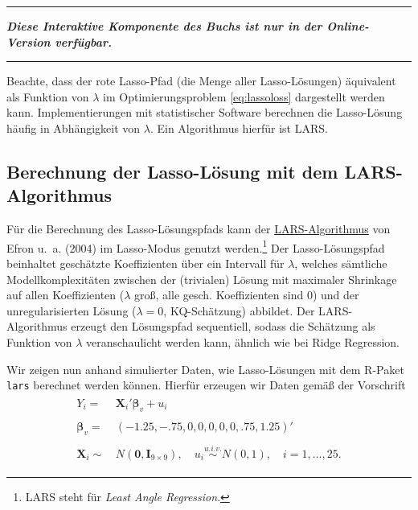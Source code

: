 \documentclass[
  a4paper,
  DIV=11,
  oneside]{scrreprt}
\begin{document}
\begin{center}\rule{0.5\linewidth}{0.5pt}\end{center}

\textbf{\emph{Diese Interaktive Komponente des Buchs ist nur in der
Online-Version verfügbar.}}

\begin{center}\rule{0.5\linewidth}{0.5pt}\end{center}

Beachte, dass der rote Lasso-Pfad (die Menge aller Lasso-Lösungen)
äquivalent als Funktion von \(\lambda\) im Optimierungsproblem
\eqref{eq:lassoloss} dargestellt werden kann. Implementierungen mit
statistischer Software berechnen die Lasso-Lösung häufig in Abhängigkeit
von \(\lambda\). Ein Algorithmus hierfür ist LARS.

\subsection{Berechnung der Lasso-Lösung mit dem
LARS-Algorithmus}\label{berechnung-der-lasso-luxf6sung-mit-dem-lars-algorithmus}

Für die Berechnung des Lasso-Lösungspfads kann der
\href{https://en.wikipedia.org/wiki/Least-angle_regression}{LARS-Algorithmus}
von Efron u.~a. (2004) im Lasso-Modus genutzt werden.\footnote{LARS
  steht für \emph{Least Angle Regression}.} Der Lasso-Lösungspfad
beinhaltet geschätzte Koeffizienten über ein Intervall für \(\lambda\),
welches sämtliche Modellkomplexitäten zwischen der (trivialen) Lösung
mit maximaler Shrinkage auf allen Koeffizienten (\(\lambda\) groß, alle
gesch. Koeffizienten sind \(0\)) und der unregularisierten Lösung
(\(\lambda = 0\), KQ-Schätzung) abbildet. Der LARS-Algorithmus erzeugt
den Lösungspfad sequentiell, sodass die Schätzung als Funktion von
\(\lambda\) veranschaulicht werden kann, ähnlich wie bei Ridge
Regression.

Wir zeigen nun anhand simulierter Daten, wie Lasso-Lösungen mit dem
R-Paket \texttt{lars} berechnet werden können. Hierfür erzeugen wir
Daten gemäß der Vorschrift \begin{align}
  \begin{split}
  Y_i =&\, \boldsymbol{X}_i' \boldsymbol{\beta}_v + u_i\\
  \\
  \boldsymbol{\beta}_v =&\, (-1.25, -.75, 0, 0, 0, 0, 0, .75, 1.25)'\\
  \\
  \boldsymbol{X}_i \sim&\, N(\boldsymbol{0}, \boldsymbol{I}_{9\times9}), \quad u_i \overset{u.i.v.}{\sim} N(0, 1), \quad i = 1,\dots,25.
  \end{split}\label{eq:larsdgp}
\end{align}
\end{document}
